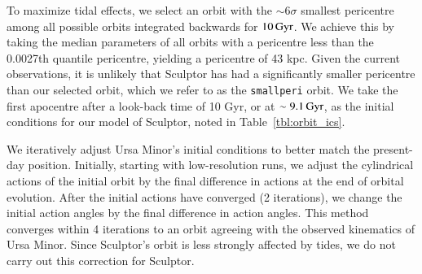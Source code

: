 \documentclass{aa}
\newcommand{\Gyr}{{\rm Gyr}}
\newcommand{\smallperi}{{\tt smallperi}}
\begin{document}
To maximize tidal effects, we select an orbit with the \(\sim 6\sigma\)
smallest pericentre among all possible orbits integrated backwards for
\(10\,\Gyr\). We achieve this by taking the median parameters of all
orbits with a pericentre less than the 0.0027th quantile pericentre,
yielding a pericentre of 43 kpc. Given the current observations, it is
unlikely that Sculptor has had a significantly smaller pericentre than
our selected orbit, which we refer to as the \smallperi{} orbit. We take
the first apocentre after a look-back time of 10 Gyr, or at
\(\sim9.1\,\Gyr\), as the initial conditions for our model of Sculptor,
noted in Table~\ref{tbl:orbit_ics}.



We iteratively adjust Ursa Minor's initial
conditions to better match the present-day position. Initially, starting with low-resolution runs, we adjust the
cylindrical actions of the initial orbit by the final difference in
actions at the end of orbital evolution. After the initial actions have
converged (2 iterations), we change the initial action angles by the
final difference in action angles. This method converges within 4
iterations to an orbit agreeing with the observed kinematics of Ursa
Minor. Since Sculptor's orbit is less strongly affected by tides, we do
not carry out this correction for Sculptor.
\end{document}

